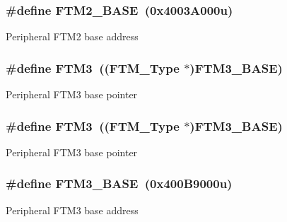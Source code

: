 \subsubsection[{\texorpdfstring{F\+T\+M2\+\_\+\+B\+A\+SE}{FTM2_BASE}}]{\setlength{\rightskip}{0pt plus 5cm}\#define F\+T\+M2\+\_\+\+B\+A\+SE~(0x4003\+A000u)}\hypertarget{group__FTM__Peripheral__Access__Layer_ga5f4976435e0a348f88929eaf23157bad}{}\label{group__FTM__Peripheral__Access__Layer_ga5f4976435e0a348f88929eaf23157bad}
Peripheral F\+T\+M2 base address 
\subsubsection[{\texorpdfstring{F\+T\+M3}{FTM3}}]{\setlength{\rightskip}{0pt plus 5cm}\#define F\+T\+M3~(({\bf F\+T\+M\+\_\+\+Type} $\ast$){\bf F\+T\+M3\+\_\+\+B\+A\+SE})}\hypertarget{group__FTM__Peripheral__Access__Layer_ga60c8197c39b5da920e82cf4a4c8b2f49}{}\label{group__FTM__Peripheral__Access__Layer_ga60c8197c39b5da920e82cf4a4c8b2f49}
Peripheral F\+T\+M3 base pointer 
\subsubsection[{\texorpdfstring{F\+T\+M3}{FTM3}}]{\setlength{\rightskip}{0pt plus 5cm}\#define F\+T\+M3~(({\bf F\+T\+M\+\_\+\+Type} $\ast$){\bf F\+T\+M3\+\_\+\+B\+A\+SE})}\hypertarget{group__FTM__Peripheral__Access__Layer_ga60c8197c39b5da920e82cf4a4c8b2f49}{}\label{group__FTM__Peripheral__Access__Layer_ga60c8197c39b5da920e82cf4a4c8b2f49}
Peripheral F\+T\+M3 base pointer 
\subsubsection[{\texorpdfstring{F\+T\+M3\+\_\+\+B\+A\+SE}{FTM3_BASE}}]{\setlength{\rightskip}{0pt plus 5cm}\#define F\+T\+M3\+\_\+\+B\+A\+SE~(0x400\+B9000u)}\hypertarget{group__FTM__Peripheral__Access__Layer_gad7c56aa0db6bb5d095ce67d04031c615}{}\label{group__FTM__Peripheral__Access__Layer_gad7c56aa0db6bb5d095ce67d04031c615}
Peripheral F\+T\+M3 base address 
